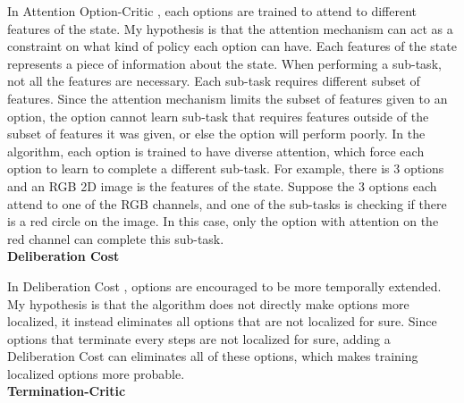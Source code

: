 \documentclass{article}
\begin{document}
	\normalsize{\quad In Attention Option-Critic \cite{attentionoptioncritic}, each options are trained to attend to different features of the state. My hypothesis is that the attention mechanism can act as a constraint on what kind of policy each option can have. Each features of the state represents a piece of information about the state. When performing a sub-task, not all the features are necessary. Each sub-task requires different subset of features. Since the attention mechanism limits the subset of features given to an option, the option cannot learn sub-task that requires features outside of the subset of features it was given, or else the option will perform poorly. In the algorithm, each option is trained to have diverse attention, which force each option to learn to complete a different sub-task. For example, there is 3 options and an RGB 2D image is the features of the state. Suppose the 3 options each attend to one of the RGB channels, and one of the sub-tasks is checking if there is a red circle on the image. In this case, only the option with attention on the red channel can complete this sub-task.}\vspace{0.15in}\\
	\large{\bfseries{Deliberation Cost}}\vspace{0.05in}
	
	\normalsize{\quad In Deliberation Cost \cite{harb2017waiting}, options are encouraged to be more temporally extended. My hypothesis is that the algorithm does not directly make options more localized, it instead eliminates all options that are not localized for sure. Since options that terminate every steps are not localized for sure, adding a Deliberation Cost can eliminates all of these options, which makes training localized options more probable.}\vspace{0.15in}\\
	\large{\bfseries{Termination-Critic}}\vspace{0.05in}
	
\end{document}
